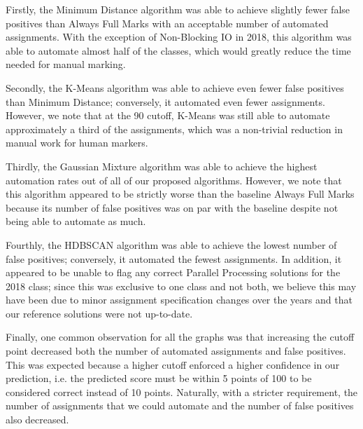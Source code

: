 Firstly, the Minimum Distance algorithm was able to achieve slightly fewer false positives than Always Full Marks with an acceptable number of automated assignments. With the exception of Non-Blocking IO in 2018, this algorithm was able to automate almost half of the classes, which would greatly reduce the time needed for manual marking.

Secondly, the K-Means algorithm was able to achieve even fewer false positives than Minimum Distance; conversely, it automated even fewer assignments. However, we note that at the 90 cutoff, K-Means was still able to automate approximately a third of the assignments, which was a non-trivial reduction in manual work for human markers.

Thirdly, the Gaussian Mixture algorithm was able to achieve the highest automation rates out of all of our proposed algorithms. However, we note that this algorithm appeared to be strictly worse than the baseline Always Full Marks because its number of false positives was on par with the baseline despite not being able to automate as much.

Fourthly, the HDBSCAN algorithm was able to achieve the lowest number of false positives; conversely, it automated the fewest assignments. In addition, it appeared to be unable to flag any correct Parallel Processing solutions for the 2018 class; since this was exclusive to one class and not both, we believe this may have been due to minor assignment specification changes over the years and that our reference solutions were not up-to-date.

Finally, one common observation for all the graphs was that increasing the cutoff point decreased both the number of automated assignments and false positives. This was expected because a higher cutoff enforced a higher confidence in our prediction, i.e. the predicted score must be within 5 points of 100 to be considered correct instead of 10 points. Naturally, with a stricter requirement, the number of assignments that we could automate and the number of false positives also decreased.
